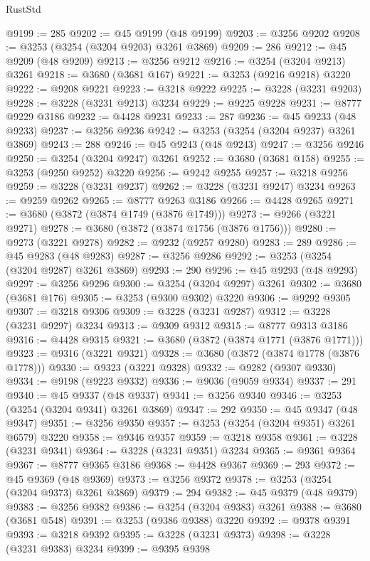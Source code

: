 \begin{lexlean}{RustStd}
\begin{coremodule}
@9199 := 285
@9202 := @45 @9199 (@48 @9199)
@9203 := @3256 @9202
@9208 := @3253 (@3254 (@3204 @9203) @3261 @3869)
@9209 := 286
@9212 := @45 @9209 (@48 @9209)
@9213 := @3256 @9212
@9216 := @3254 (@3204 @9213) @3261
@9218 := @3680 (@3681 @167)
@9221 := @3253 (@9216 @9218) @3220
@9222 := @9208 @9221
@9223 := @3218 @9222
@9225 := @3228 (@3231 @9203)
@9228 := @3228 (@3231 @9213) @3234
@9229 := @9225 @9228
@9231 := @8777 @9229 @3186
@9232 := @4428 @9231
@9233 := 287
@9236 := @45 @9233 (@48 @9233)
@9237 := @3256 @9236
@9242 := @3253 (@3254 (@3204 @9237) @3261 @3869)
@9243 := 288
@9246 := @45 @9243 (@48 @9243)
@9247 := @3256 @9246
@9250 := @3254 (@3204 @9247) @3261
@9252 := @3680 (@3681 @158)
@9255 := @3253 (@9250 @9252) @3220
@9256 := @9242 @9255
@9257 := @3218 @9256
@9259 := @3228 (@3231 @9237)
@9262 := @3228 (@3231 @9247) @3234
@9263 := @9259 @9262
@9265 := @8777 @9263 @3186
@9266 := @4428 @9265
@9271 := @3680 (@3872 (@3874 @1749 (@3876 @1749)))
@9273 := @9266 (@3221 @9271)
@9278 := @3680 (@3872 (@3874 @1756 (@3876 @1756)))
@9280 := @9273 (@3221 @9278)
@9282 := @9232 (@9257 @9280)
@9283 := 289
@9286 := @45 @9283 (@48 @9283)
@9287 := @3256 @9286
@9292 := @3253 (@3254 (@3204 @9287) @3261 @3869)
@9293 := 290
@9296 := @45 @9293 (@48 @9293)
@9297 := @3256 @9296
@9300 := @3254 (@3204 @9297) @3261
@9302 := @3680 (@3681 @176)
@9305 := @3253 (@9300 @9302) @3220
@9306 := @9292 @9305
@9307 := @3218 @9306
@9309 := @3228 (@3231 @9287)
@9312 := @3228 (@3231 @9297) @3234
@9313 := @9309 @9312
@9315 := @8777 @9313 @3186
@9316 := @4428 @9315
@9321 := @3680 (@3872 (@3874 @1771 (@3876 @1771)))
@9323 := @9316 (@3221 @9321)
@9328 := @3680 (@3872 (@3874 @1778 (@3876 @1778)))
@9330 := @9323 (@3221 @9328)
@9332 := @9282 (@9307 @9330)
@9334 := @9198 (@9223 @9332)
@9336 := @9036 (@9059 @9334)
@9337 := 291
@9340 := @45 @9337 (@48 @9337)
@9341 := @3256 @9340
@9346 := @3253 (@3254 (@3204 @9341) @3261 @3869)
@9347 := 292
@9350 := @45 @9347 (@48 @9347)
@9351 := @3256 @9350
@9357 := @3253 (@3254 (@3204 @9351) @3261 @6579) @3220
@9358 := @9346 @9357
@9359 := @3218 @9358
@9361 := @3228 (@3231 @9341)
@9364 := @3228 (@3231 @9351) @3234
@9365 := @9361 @9364
@9367 := @8777 @9365 @3186
@9368 := @4428 @9367
@9369 := 293
@9372 := @45 @9369 (@48 @9369)
@9373 := @3256 @9372
@9378 := @3253 (@3254 (@3204 @9373) @3261 @3869)
@9379 := 294
@9382 := @45 @9379 (@48 @9379)
@9383 := @3256 @9382
@9386 := @3254 (@3204 @9383) @3261
@9388 := @3680 (@3681 @548)
@9391 := @3253 (@9386 @9388) @3220
@9392 := @9378 @9391
@9393 := @3218 @9392
@9395 := @3228 (@3231 @9373)
@9398 := @3228 (@3231 @9383) @3234
@9399 := @9395 @9398

\end{coremodule}
\end{lexlean}
